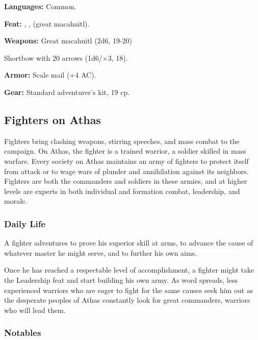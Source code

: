 \textbf{Languages:} Common.

\textbf{Feat:} , ,  (great macahuitl).

\textbf{Weapons:} Great macahuitl (2d6, 19-20)

Shortbow with 20 arrows (1d6/$\times$3, 18).

\textbf{Armor:} Scale mail (+4 AC).

\textbf{Gear:} Standard adventurer's kit, 19 cp.

\subsection{Fighters on Athas}

Fighters bring clashing weapons, stirring speeches, and mass combat to the campaign. On Athas, the fighter is a trained warrior, a soldier skilled in mass warfare. Every society on Athas maintains an army of fighters to protect itself from attack or to wage wars of plunder and annihilation against its neighbors. Fighters are both the commanders and soldiers in these armies, and at higher levels are experts in both individual and formation combat, leadership, and morale.

\subsubsection{Daily Life}

A fighter adventures to prove his superior skill at arms, to advance the cause of whatever master he might serve, and to further his own aims.

Once he has reached a respectable level of accomplishment, a fighter might take the Leadership feat and start building his own army. As word spreads, less experienced warriors who are eager to fight for the same causes seek him out as the desperate peoples of Athas constantly look for great commanders, warriors who will lead them.

\subsubsection{Notables}

